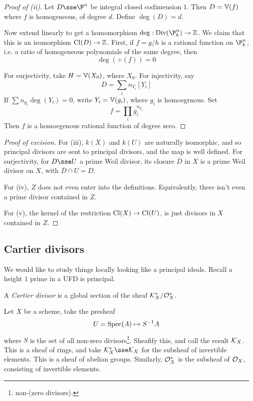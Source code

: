 \documentclass{article}
\begin{document}
\begin{proof}
    [Proof of (ii)] Let \(D \sse \P^n\) be integral closed codimension \(1\). Then \(D = \mathbb{V}(f)\) where \(f\) is homogeneous, of degree \(d\). Define \(\deg(D) = d\). 

    Now extend linearly to get a homomorphism \(\deg : \Div(\P^n_k) \to \Z\). We claim that this is an isomorphism \(\operatorname{Cl}(D) \to \mathbb{Z}\). First, if \(f = g/h\) is a rational function on \(\P^n_k\), i.e. a ratio of homogeneous polynomials of the same degree, then
    \[\deg(\div(f)) = 0\]

    For surjectivity, take \(H = \mathbb{V}(X_0)\), where \(X_0\). For injectivity, say
    \[D = \sum_i n_{Y_i}[Y_i]\]
    If \(\sum n_{y_i}\deg(Y_i) = 0\), write \(Y_i = \mathbb{V}(g_i)\), where \(g_i\) is homoegrnous. Set
    \[f = \prod_i g_i^{n_{Y_i}}\]
    Then \(f\) is a homoegenous rational function of degree zero.
\end{proof}

\begin{proof}
    [Proof of excision] For (iii), \(k(X)\) and \(k(U)\) are naturally isomorphic, and so principal divisors are sent to principal divisors, and the map is well defined. For surjectivity, for \(D \sse U\) a prime Weil divisor, its closure \(\overline D\) in \(X\) is a prime Weil divisor on \(X\), with \(\overline D \cap U = D\).

    For (iv), \(Z\) does not even enter into the definitions. Equivalently, there isn't even a prime divisor contained in \(Z\).

    For (v), the kernel of the restriction \(\operatorname{Cl}(X) \to \operatorname{Cl}(U)\), is just divisors in \(X\) contained in \(Z\).
\end{proof}

\subsection{Cartier divisors}

We would like to study things locally looking like a principal ideals. Recall a height \(1\) prime in a UFD is principal.

\begin{definition}
    A \emph{Cartier divisor} is a global section of the sheaf \(\mathcal{K}_X^* / \mathcal{O}_X^*\).
\end{definition}

Let \(X\) be a scheme, take the presheaf 
\[U = \operatorname{Spec}(A)\mapsto S^{-1}A\]
where \(S\) is the set of all non-zero divisors\footnote{non-(zero divisors).}. Sheafify this, and call the result \(\mathcal{K}_X\). This is a sheaf of rings, and take \(\mcK_X^* \sse \mcK_X\) for the subsheaf of invertible elements. This is a sheaf of abelian groups. Similarly, \(\mathcal{O}_X^*\) is the subsheaf of \(\mathcal{O}_X\), consisting of invertible elements.
\end{document}
